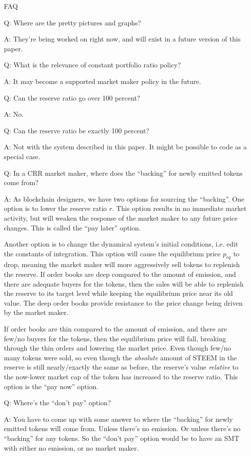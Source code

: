 \documentclass{article}
\begin{document}
FAQ

Q:  Where are the pretty pictures and graphs?

A:  They're being worked on right now, and will exist in a future version of this paper.

Q:  What is the relevance of constant portfolio ratio policy?

A:  It may become a supported market maker policy in the future.

Q:  Can the reserve ratio go over 100 percent?

A:  No.

Q:  Can the reserve ratio be exactly 100 percent?

A:  Not with the system described in this paper.  It might be possible to code as a special case.

Q:  In a CRR market maker, where does the ``backing'' for newly emitted tokens come from?

A:  As blockchain designers, we have two options for sourcing the ``backing''.  One option
is to lower the reserve ratio $r$.  This option results in no immediate market
activity, but will weaken the response of the market maker to any future price changes.
This is called the ``pay later'' option.

Another option is to change the dynamical system's initial conditions, i.e. edit the
constants of integration.  This option will cause the equilibrium price $p_{eq}$ to drop,
meaning the market maker will more aggressively sell tokens to replenish the reserve.
If order books are deep compared to the amount of emission, and there are adequate buyers
for the tokens, then the sales will be able to replenish the reserve to its target level while
keeping the equilibrium price near its old value.  The deep order books provide resistance to
the price change being driven by the market maker.

If order books are thin compared to the amount of emission, and there are few/no buyers for the
tokens, then the equilibrium price will fall, breaking through the thin orders and lowering
the market price.  Even though few/no many tokens were sold, so even though the
\textit{absolute} amount of STEEM in the reserve is still nearly/exactly the same as before,
the reserve's value \textit{relative} to the now-lower market cap of the token has increased
to the reserve ratio.  This option is the ``pay now'' option.

Q:  Where's the ``don't pay'' option?

A:  You have to come up with some answer to where the ``backing'' for newly emitted
tokens will come from.  Unless there's no emission.  Or unless there's no ``backing'' for
any tokens.  So the ``don't pay'' option would be to have an SMT with either no
emission, or no market maker.
\end{document}
